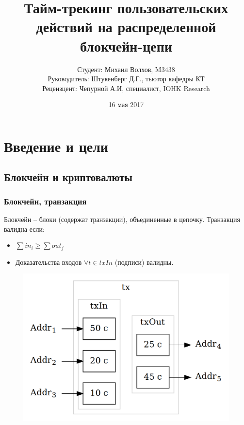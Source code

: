 \documentclass[11pt,handout,pdf,hyperref={unicode}]{beamer}
\title[Тайм-трекинг на блокчейне]{Тайм-трекинг пользовательских действий на распределенной блокчейн-цепи}
\begin{document}
\author[Михаил Волхов, M3438]{
  Студент: Михаил Волхов, M3438\\
  Руководитель: Штукенберг Д.Г., тьютор кафедры КТ \\
  Рецензцент: Чепурной А.И, специалист, IOHK Research
}
\date{16 мая 2017}

\frame{\titlepage}

\section{Введение и цели}

\subsection{Блокчейн и криптовалюты}

\begin{frame}
  \frametitle{Блокчейн, транзакция}

  Блокчейн -- блоки (содержат транзакции), объединенные в
  цепочку. Транзакция валидна если:

  \begin{itemize}
  \item $\sum{in_i} \geq \sum {out_j}$
  \item Доказательства входов $\forall t \in txIn$ (подписи) валидны.
  \end{itemize}

  \begin{figure}[t]
  \includegraphics[scale=0.2]{tx_example}
  \centering
  \end{figure}
\end{frame}
\end{document}
